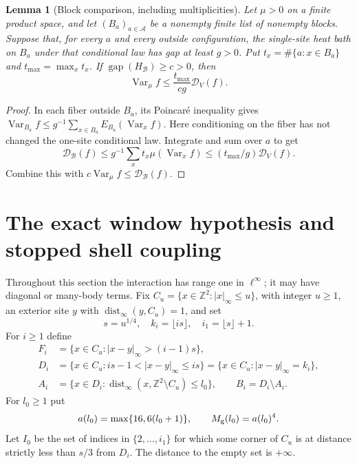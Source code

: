 \documentclass[11pt]{amsart}
\newtheorem{lemma}[theorem]{Lemma}
\theoremstyle{definition}
\newcommand{\Z}{\mathbb Z}
\newcommand{\Var}{\operatorname{Var}}
\newcommand{\gap}{\operatorname{gap}}
\newcommand{\dist}{\operatorname{dist}_\infty}
\newcommand{\cD}{\mathcal D}
\newcommand{\1}{\mathbf 1}
\begin{document}
\begin{lemma}[Block comparison, including multiplicities]
\label{lem:comparison}
Let $\mu>0$ on a finite product space, and let $(B_a)_{a\in\mathcal A}$
be a nonempty finite list of nonempty blocks. Suppose that, for every
$a$ and every outside configuration, the single-site heat bath on $B_a$
under that conditional law has gap at least $g>0$. Put
$t_x=\#\{a:x\in B_a\}$ and $t_{\max}=\max_x t_x$.
If $\gap(H_{\mathscr B})\ge c>0$, then
\begin{equation}\label{eq:blockcompare}
 \Var_\mu f\le\frac{t_{\max}}{cg}\cD_V(f).
\end{equation}
\end{lemma}
\begin{proof}
In each fiber outside $B_a$, its Poincar\'e inequality gives
$\Var_{B_a}f\le g^{-1}\sum_{x\in B_a}E_{B_a}(\Var_xf)$.
Here conditioning on the fiber has not changed the one-site conditional
law. Integrate and sum over $a$ to get
\[
 \cD_{\mathscr B}(f)\le g^{-1}\sum_x t_x\mu(\Var_xf)
           \le (t_{\max}/g)\cD_V(f).
\]
Combine this with $c\Var_\mu f\le\cD_{\mathscr B}(f)$.
\end{proof}

\section{The exact window hypothesis and stopped shell coupling}
\label{sec:shell}

Throughout this section the interaction has range one in $\ell^\infty$;
it may have diagonal or many-body terms. Fix
$C_u=\{x\in\Z^2:|x|_\infty\le u\}$, with integer $u\ge1$, an exterior
site $y$ with $\dist(y,C_u)=1$, and set
\[
 s=u^{1/4},\quad k_i=\lfloor is\rfloor,\quad
 i_1=\lfloor s\rfloor+1.
\]
For $i\ge1$ define
\begin{align}\label{eq:shells}
 F_i&=\{x\in C_u:|x-y|_\infty>(i-1)s\},\nonumber\\
 D_i&=\{x\in C_u:is-1<|x-y|_\infty\le is\}
      =\{x\in C_u:|x-y|_\infty=k_i\},\\
 A_i&=\{x\in D_i:\dist(x,\Z^2\setminus C_u)\le l_0\},
 \qquad B_i=D_i\setminus A_i.\nonumber
\end{align}
For $l_0\ge1$ put
\begin{equation}\label{eq:geomscale}
 a(l_0)=\max\{16,6(l_0+1)\},\qquad M_{\rm g}(l_0)=a(l_0)^4.
\end{equation}
Let $I_0$ be the set of indices in $\{2,\ldots,i_1\}$ for which some
corner of $C_u$ is at distance strictly less than $s/3$ from $D_i$.
The distance to the empty set is $+\infty$.
\end{document}
